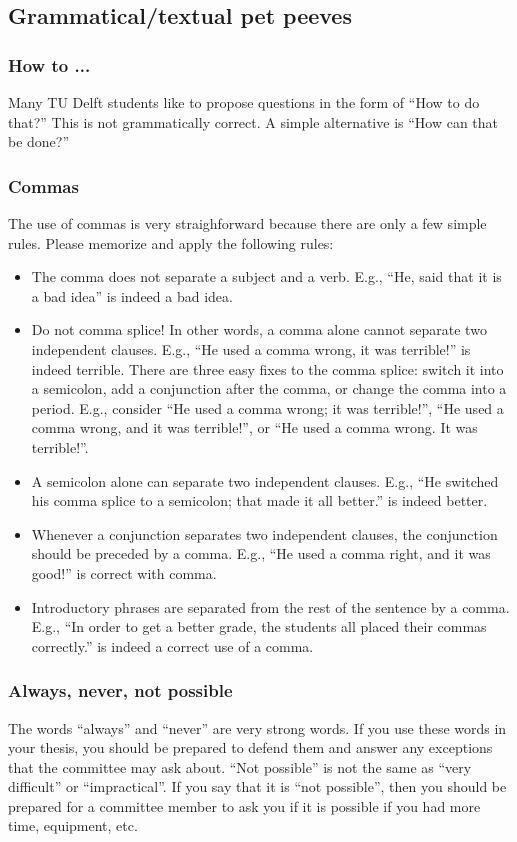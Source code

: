 \documentclass{article}
\begin{document}
 


\subsection{Grammatical/textual pet peeves}
\subsubsection{How to ...}
Many TU Delft students like to propose questions in the form of “How to do that?” This is not grammatically correct. A simple alternative is “How can that be done?”

\subsubsection{Commas}
The use of commas is very straighforward because there are only a few simple rules. Please memorize and apply the following rules:
\begin{itemize}
    \item The comma does not separate a subject and a verb. E.g., “He, said that it is a bad idea” is indeed a bad idea.
    \item Do not comma splice! In other words, a comma alone cannot separate two independent clauses. E.g., “He used a comma wrong, it was terrible!” is indeed terrible. There are three easy fixes to the comma splice: switch it into a semicolon, add a conjunction after the comma, or change the comma into a period. E.g., consider “He used a comma wrong; it was terrible!”, “He used a comma wrong, and it was terrible!”, or “He used a comma wrong. It was terrible!”.
    \item A semicolon alone can separate two independent clauses. E.g., “He switched his comma splice to a semicolon; that made it all better.” is indeed better.
    \item Whenever a conjunction separates two independent clauses, the conjunction should be preceded by a comma. E.g., “He used a comma right, and it was good!” is correct with comma.
    \item Introductory phrases are separated from the rest of the sentence by a comma. E.g., “In order to get a better grade, the students all placed their commas correctly.” is indeed a correct use of a comma.
\end{itemize}

\subsubsection{Always, never, not possible}
The words “always” and “never” are very strong words. If you use these words in your thesis, you should be prepared to defend them and answer any exceptions that the committee may ask about. “Not possible” is not the same as “very difficult” or “impractical”. If you say that it is “not possible”, then you should be prepared for a committee member to ask you if it is possible if you had more time, equipment, etc.
\end{document}

